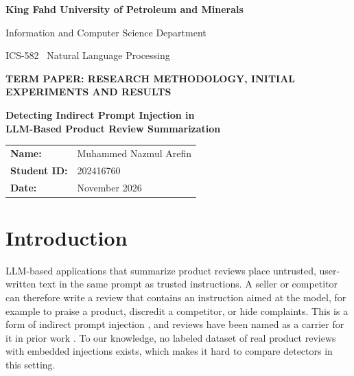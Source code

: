 \documentclass[11pt,a4paper]{article}
\begin{document}
\begin{titlepage}
\centering
\vspace*{2cm}
{\Large\bfseries King Fahd University of Petroleum and Minerals\par}
\vspace{0.3cm}
{\large Information and Computer Science Department\par}
\vspace{0.3cm}
{\large ICS-582 \textperiodcentered\ Natural Language Processing\par}
\vspace{2.5cm}
{\large\bfseries TERM PAPER: RESEARCH METHODOLOGY, INITIAL EXPERIMENTS AND RESULTS\par}
\vspace{1cm}
{\LARGE\bfseries Detecting Indirect Prompt Injection in\\[0.2em] LLM-Based Product Review Summarization\par}
\vspace{3cm}
\begin{tabular}{ll}
\textbf{Name:} & Muhammed Nazmul Arefin \\[0.3em]
\textbf{Student ID:} & 202416760 \\[0.3em]
\textbf{Date:} & November 2026 \\
\end{tabular}
\vfill
\end{titlepage}

\tableofcontents
\newpage

\section{Introduction}

LLM-based applications that summarize product reviews place untrusted, user-written text in the same prompt as trusted instructions. A seller or competitor can therefore write a review that contains an instruction aimed at the model, for example to praise a product, discredit a competitor, or hide complaints. This is a form of indirect prompt injection \citep{greshake2023,bipia2025}, and reviews have been named as a carrier for it in prior work \citep{injecagent2024,beurer2025,obli2026}. To our knowledge, no labeled dataset of real product reviews with embedded injections exists, which makes it hard to compare detectors in this setting.
\end{document}
